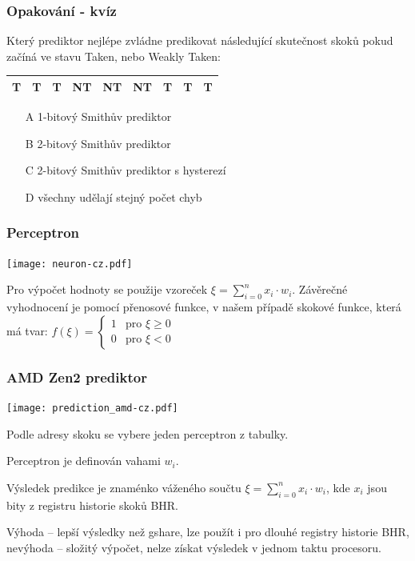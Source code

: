 \documentclass{beamer}
\begin{document}
\begin{frame}
\frametitle{Opakování - kvíz}

Který prediktor nejlépe zvládne predikovat následující skutečnost skoků pokud začíná ve stavu Taken, nebo Weakly Taken:

\begin{tabular}{|c|c|c|c|c|c|c|c|c|}\hline
T & T & T & NT & NT & NT& T & T & T \\ \hline
\end{tabular}

\bigskip
\begin{itemize}
 \item[A] 1-bitový Smithův prediktor
 \item[B] 2-bitový Smithův prediktor
 \item[C] 2-bitový Smithův prediktor s hysterezí
 \item[D] všechny udělají stejný počet chyb
\end{itemize}
\end{frame}


\begin{frame}
\frametitle{Perceptron}

\begin{center}
\texttt{[image: neuron-cz.pdf]}
\end{center}

Pro výpočet hodnoty se použije vzoreček $\xi = \sum_{i=0}^{n} x_i \cdot w_i$. Závěrečné vyhodnocení je pomocí přenosové funkce, v našem případě skokové funkce, která má tvar:
$f(\xi) = \begin{cases}1& \text{pro } \xi \ge 0\\0& \text{pro }\xi <0\end{cases}$ 
\end{frame}


\begin{frame}
\frametitle{AMD Zen2 prediktor}

\begin{center}
\texttt{[image: prediction\_amd-cz.pdf]}
\end{center}

Podle adresy skoku se vybere jeden perceptron z tabulky. 

Perceptron je definován vahami $w_i$. 

Výsledek predikce je znaménko váženého součtu $\xi = \sum_{i=0}^{n} x_i \cdot w_i$, kde $x_i$ jsou bity z registru historie skoků BHR.

Výhoda -- lepší výsledky než gshare, lze použít i pro dlouhé registry historie BHR, nevýhoda -- složitý výpočet, nelze získat výsledek v jednom taktu procesoru.
\end{frame}
\end{document}
